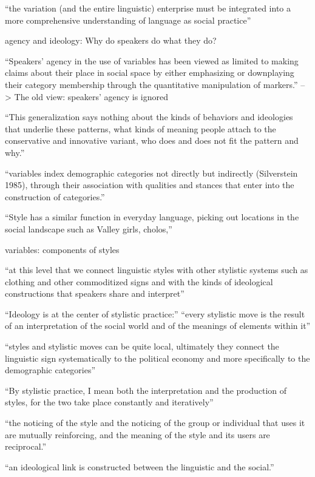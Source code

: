 ``the variation (and the entire linguistic) enterprise must
be integrated into a more comprehensive understanding of language as social
practice''

agency and ideology: Why do speakers do what they do?

``Speakers’ agency in the use of variables has
been viewed as limited to making claims about their place in social space by
either emphasizing or downplaying their category membership through the
quantitative manipulation of markers.''
--> The old view: speakers' agency is ignored

``This generalization says nothing about the kinds of behaviors and ideologies that
underlie these patterns, what kinds of meaning people attach to the conservative
and innovative variant, who does and does not fit the pattern and why.''

``variables index demographic categories not directly but indirectly (Silverstein
1985), through their association with qualities and stances that enter into the
construction of categories.''

``Style has a similar function in everyday language,
picking out locations in the social landscape such as Valley girls, cholos,''

variables: components of styles

``at this level that we connect linguistic styles with other stylistic systems
such as clothing and other commoditized signs and with the kinds of ideological
constructions that speakers share and interpret''

``Ideology is at the center of stylistic practice:''
``every stylistic move is the result of an interpretation of the social
world and of the meanings of elements within it''

``styles and stylistic moves can be quite local, ultimately they connect the
linguistic sign systematically to the political economy and more specifically to
the demographic categories''

``By stylistic practice, I mean both the interpretation and the production of
styles, for the two take place constantly and iteratively''

``the noticing of the style and the noticing of the group or individual that
uses it are mutually reinforcing, and the meaning of the style and its users
are reciprocal.''

``an ideological link is constructed between the linguistic and the social.''

%
%

